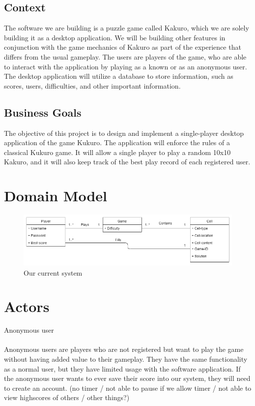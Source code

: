 \documentclass[12pt]{article}
\begin{document}
\subsection{Context}

The software we are building is a puzzle game called Kakuro, which we are solely building it as a desktop application. We will be building other features in conjunction with the game mechanics of Kakuro as part of the experience that differs from the usual gameplay. The users are players of the game, who are able to interact with the application by playing as a known or as an anonymous user. The desktop application will utilize a database to store information, such as scores, users, difficulties, and other important information. 


\subsection{Business Goals}

The objective of this project is to design and implement a single-player desktop application of the game Kukuro. The application will enforce the rules of a classical Kukuro game. It will allow a single player to play a random 10x10 Kakuro, and it will also keep track of the best play record of each registered user. 



\section{Domain Model}

\begin{figure}[htbp]
    \centering
    \includegraphics[scale=0.6]{DomainModel}
    \caption{Our current system}
    \label{fig:DomainModel}
\end{figure}


\section{Actors}
Anonymous user \\\\
Anonymous users are players who are not registered but want to play the game without having added value to their gameplay. They have the same functionality as a normal user, but they have limited usage with the software application. If the anonymous user wants to ever save their score into our system, they will need to create an account. (no timer / not able to pause  if we allow timer / not able to view highscores of others /  other things?) \\
\end{document}

